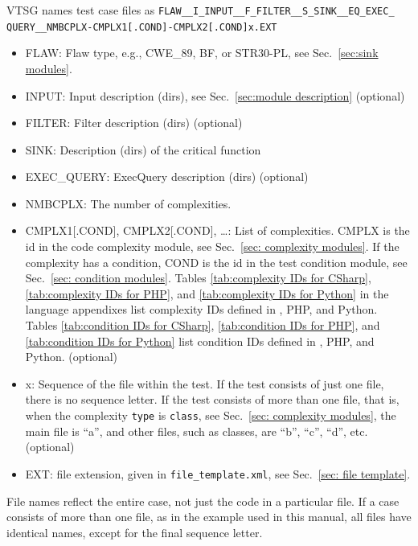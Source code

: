 VTSG names test case files as
\verb|FLAW__I_INPUT__F_FILTER__S_SINK__EQ_EXEC_| \\
\verb|QUERY__NMBCPLX-CMPLX1[.COND]-CMPLX2[.COND]x.EXT|
\begin{itemize}[nosep]
    \item FLAW: Flaw type, e.g., CWE\_89, BF, or STR30-PL, see
	Sec.~\ref{sec:sink modules}.
    \item INPUT: Input description (dirs), see Sec.~\ref{sec:module description} (optional)
    \item FILTER:  Filter description (dirs) (optional)
    \item SINK:  Description (dirs) of the critical function
    \item EXEC\_QUERY:  ExecQuery description (dirs) (optional)

    \item NMBCPLX:  The number of complexities.
    \item CMPLX1[.COND], CMPLX2[.COND], \ldots: List of complexities.
            CMPLX is the id in the code complexity module,
            see Sec.~\ref{sec: complexity modules}.
            If the complexity has a
            condition, COND is the id in the test condition module,
            see Sec.~\ref{sec: condition modules}.
            Tables \ref{tab:complexity IDs for CSharp},
            \ref{tab:complexity IDs for PHP}, and
            \ref{tab:complexity IDs for Python} in the language appendixes list
            complexity IDs defined in \CSharp, PHP, and Python.
            Tables \ref{tab:condition IDs for CSharp},
            \ref{tab:condition IDs for PHP}, and
            \ref{tab:condition IDs for Python} list condition
            IDs defined in \CSharp, PHP, and Python. (optional)
    \item x: Sequence of the file within the test.  If the test consists of just one
      file, there is no sequence letter.  If the test consists of more than one file,
      that is, when the complexity \verb|type| is \verb|class|,
      see Sec.~\ref{sec: complexity modules},
      the main file is ``a'', and other files, such as classes, are ``b'', ``c'',
      ``d'', etc. (optional)
    \item EXT: file extension, given in \verb|file_template.xml|, see
    Sec.~\ref{sec: file template}.
\end{itemize}

File names reflect the entire case, not just the code in a
particular file.  If a case consists of more than one file, as in the
example used in this manual, all files have
identical names, except for the final sequence letter.

